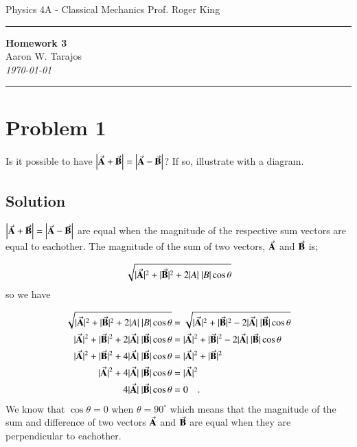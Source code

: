 \documentclass{article}
\begin{document}
\noindent
Physics 4A - Classical Mechanics \hfill Prof. Roger King

\noindent\rule{\textwidth}{0.4pt}

\begin{center}
    \textbf{\LARGE Homework 3} \\
    \vspace{12pt}
    \large Aaron W. Tarajos \\
    \textit{\today}
\end{center}

\noindent\rule{\textwidth}{0.4pt}

\section*{Problem 1}
Is it possible to have $\left| \va A + \va B \right| = \left| \va A - \va B\right|$? If so, illustrate with a diagram.

\subsection*{Solution}
$\left| \va A + \va B \right| = \left| \va A - \va B\right|$ are equal when the magnitude of the respective sum vectors are equal to eachother.
The magnitude of the sum of two vectors, $\va A$ and $\va B$ is;

\[
\sqrt{|\va A|^2 + |\va B|^2 + 2|A|\ |B|\cos\theta}
\]
so we have

\begin{align*}
	\sqrt{|\va A|^2 + |\va B|^2 + 2|A|\ |B|\cos\theta} &= \sqrt{|\va A|^2 + |\va B|^2 - 2|\va A|\ |\va B|\cos\theta} \\
	|\va A|^2 + |\va B|^2 + 2|\va A|\ |\va B|\cos\theta &= |\va A|^2 + |\va B|^2 - 2|\va A|\ |\va B|\cos\theta \\
	|\va A|^2 + |\va B|^2 + 4|\va A|\ |\va B|\cos\theta &= |\va A|^2 + |\va B|^2 \\
	|\va A|^2 + 4|\va A|\ |\va B|\cos\theta &= |\va A|^2 \\
	4|\va A|\ |\va B|\cos\theta &= 0 \quad .
\end{align*}
We know that $\cos\theta=0$ when $\theta = 90^\circ$ which means that the magnitude of the sum and difference of two vectors $\va A$ and $\va B$ are equal when they are perpendicular to eachother.
\end{document}
